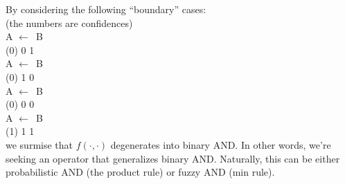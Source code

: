 \documentclass[a4paper]{report}
\begin{document}
By considering the following ``boundary'' cases:\\
(the numbers are confidences)\\
\hspace*{1cm} A $\leftarrow$\textemdash\textemdash\textemdash\textemdash\textemdash $\,$ B\\
\hspace*{1cm} (0) \hspace*{0.8cm} 0 \hspace*{0.8cm} 1\\
\hspace*{1cm} A $\leftarrow$\textemdash\textemdash\textemdash\textemdash\textemdash $\,$ B\\
\hspace*{1cm} (0) \hspace*{0.8cm} 1 \hspace*{0.8cm} 0 \\
\hspace*{1cm} A $\leftarrow$\textemdash\textemdash\textemdash\textemdash\textemdash $\,$ B\\
\hspace*{1cm} (0) \hspace*{0.8cm} 0 \hspace*{0.8cm} 0 \\
\hspace*{1cm} A $\leftarrow$\textemdash\textemdash\textemdash\textemdash\textemdash $\,$ B\\
\hspace*{1cm} (1) \hspace*{0.8cm} 1 \hspace*{0.8cm} 1\\
we surmise that $f(\cdot,\cdot)$ degenerates into binary AND.  In other words, we're seeking an operator that generalizes binary AND.  Naturally, this can be either probabilistic AND (the product rule) or fuzzy AND (min rule).
\end{document}
